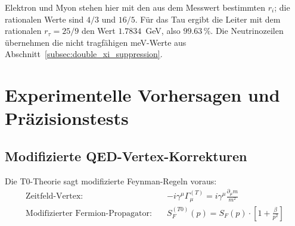	\begin{table}[H]
		\centering
		\caption{Numerische Äquivalenz beider T0-Methoden für alle Leptonen}
		\label{tab:numerische_aequivalenz_komplett}
	\end{table}
	
	Elektron und Myon stehen hier mit den aus dem Messwert bestimmten $r_i$; die rationalen Werte sind $4/3$ und $16/5$. Für das Tau ergibt die Leiter mit dem rationalen $r_\tau = 25/9$ den Wert $1.7834$~GeV, also $99.63\,\%$. Die Neutrinozeilen übernehmen die nicht tragfähigen meV-Werte aus Abschnitt~\ref{subsec:double_xi_suppression}.
	
	\section{Experimentelle Vorhersagen und Präzisionstests}
	\label{sec:experimentelle_vorhersagen}
	
	\subsection{Modifizierte QED-Vertex-Korrekturen}
	\label{subsec:qed_corrections}
	
	Die T0-Theorie sagt modifizierte Feynman-Regeln voraus:
	\begin{align}
		\text{Zeitfeld-Vertex:} \quad &-i\gamma^\mu\Gamma_\mu^{(T)} = i\gamma^\mu\frac{\partial_\mu m}{m^2} \\
		\text{Modifizierter Fermion-Propagator:} \quad &S_F^{(T0)}(p) = S_F(p) \cdot \left[1 + \frac{\beta}{p^2}\right]
	\end{align}
	
